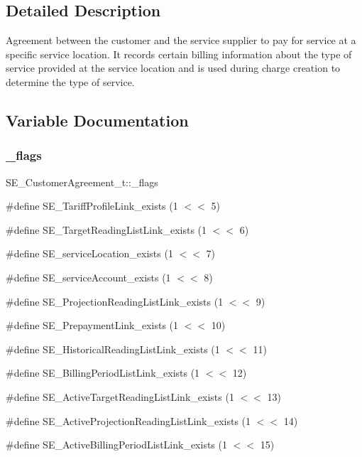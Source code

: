 \subsection{Detailed Description}
Agreement between the customer and the service supplier to pay for service at a specific service location. It records certain billing information about the type of service provided at the service location and is used during charge creation to determine the type of service. 

\subsection{Variable Documentation}
\mbox{\label{group__CustomerAgreement_ga8ddcbc34833c692c07c506a9f7b2b8ee}} 
\subsubsection{\texorpdfstring{\+\_\+flags}{\_flags}}
{\footnotesize\ttfamily S\+E\+\_\+\+Customer\+Agreement\+\_\+t\+::\+\_\+flags}

\#define S\+E\+\_\+\+Tariff\+Profile\+Link\+\_\+exists (1 $<$$<$ 5)

\#define S\+E\+\_\+\+Target\+Reading\+List\+Link\+\_\+exists (1 $<$$<$ 6)

\#define S\+E\+\_\+service\+Location\+\_\+exists (1 $<$$<$ 7)

\#define S\+E\+\_\+service\+Account\+\_\+exists (1 $<$$<$ 8)

\#define S\+E\+\_\+\+Projection\+Reading\+List\+Link\+\_\+exists (1 $<$$<$ 9)

\#define S\+E\+\_\+\+Prepayment\+Link\+\_\+exists (1 $<$$<$ 10)

\#define S\+E\+\_\+\+Historical\+Reading\+List\+Link\+\_\+exists (1 $<$$<$ 11)

\#define S\+E\+\_\+\+Billing\+Period\+List\+Link\+\_\+exists (1 $<$$<$ 12)

\#define S\+E\+\_\+\+Active\+Target\+Reading\+List\+Link\+\_\+exists (1 $<$$<$ 13)

\#define S\+E\+\_\+\+Active\+Projection\+Reading\+List\+Link\+\_\+exists (1 $<$$<$ 14)

\#define S\+E\+\_\+\+Active\+Billing\+Period\+List\+Link\+\_\+exists (1 $<$$<$ 15) \mbox{\label{group__CustomerAgreement_gaf44dd3b2c278f39a6a43178bc50eabbd}} 
